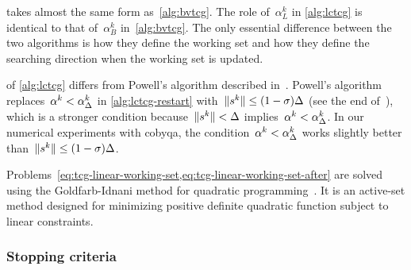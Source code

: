 \begin{algorithm}
{        
    }
\end{algorithm}

 takes almost the same form as~\cref{alg:bvtcg}.
The role of~$\alpha_L^k$ in \cref{alg:lctcg} is identical to that of~$\alpha_B^k$ in~\cref{alg:bvtcg}.
The only essential difference between the two algorithms is how they define the working set and how
they define the searching direction when the working set is updated.

 of \cref{alg:lctcg} differs from Powell's algorithm described in~\cite[\S~3,\S~5]{Powell_2015}.
Powell's algorithm replaces~$\alpha^k < \alpha_{\rad}^k$ in \cref{alg:lctcg-restart} with~$\norm{\sstep[k]} \le (1-\sigma)\rad$ (see the end of~\cite[\S~3]{Powell_2015}),
which is a stronger condition because~$\norm{\sstep[k]} < \rad$ implies~$\alpha^k < \alpha_{\rad}^k$.
In our numerical experiments with \gls{cobyqa}, the condition~$\alpha^k < \alpha_{\rad}^k$ works slightly better than~$\norm{\sstep[k]} \le (1-\sigma)\rad$.

Problems~\cref{eq:tcg-linear-working-set,eq:tcg-linear-working-set-after} are solved using the Goldfarb-Idnani method for quadratic programming~\cite{Goldfarb_Idnani_1983}.
It is an active-set method designed for minimizing positive definite quadratic function subject to linear constraints.

\subsubsection{Stopping criteria}

